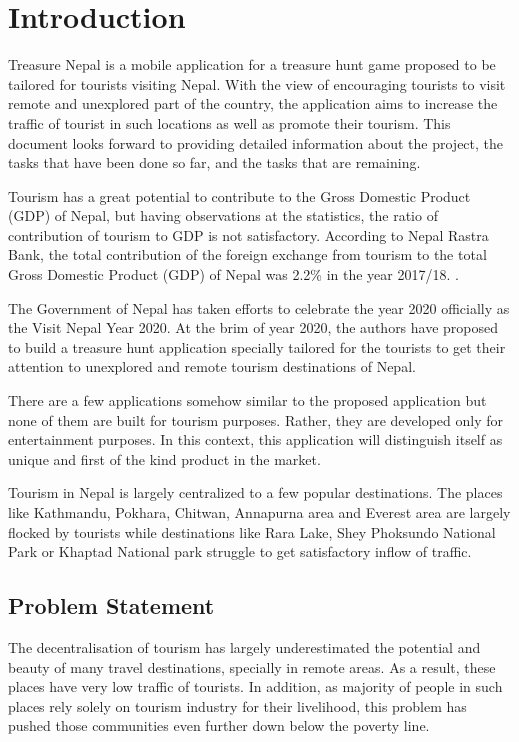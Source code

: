 \documentclass[12pt, a4paper, oneside]{article}
\begin{document}
\section{Introduction} 
Treasure Nepal is a mobile application for a treasure hunt game proposed to be tailored for tourists visiting Nepal. With the view of encouraging tourists to visit remote and unexplored part of the country, the application aims to increase the traffic of tourist in such locations as well as promote their tourism. This document looks forward to providing detailed information about the project, the tasks that have been done so far, and the tasks that are remaining.

Tourism has a great potential to contribute to the Gross Domestic Product (GDP) of Nepal, but having observations at the statistics, the ratio of contribution of tourism to GDP is not satisfactory. According to Nepal Rastra Bank, the total contribution of the foreign exchange from tourism to the total Gross Domestic Product (GDP) of Nepal was 2.2\% in the year 2017/18. \cite{tourismstats}.

The Government of Nepal has taken efforts to celebrate the year 2020 officially as the Visit Nepal Year 2020. At the brim of year 2020, the authors have proposed to build a treasure hunt application specially tailored for the tourists to get their attention to unexplored and remote tourism destinations of Nepal. 

There are a few applications somehow similar to the proposed application but none of them are built for tourism purposes. Rather, they are developed only for entertainment purposes. In this context, this application will distinguish itself as unique and first of the kind product in the market.

Tourism in Nepal is largely centralized to a few popular destinations. The places like Kathmandu, Pokhara, Chitwan, Annapurna area and Everest area are largely flocked by tourists while destinations like Rara Lake, Shey Phoksundo National Park or Khaptad National park struggle to get satisfactory inflow of traffic.

\subsection{Problem Statement}
The decentralisation of tourism has largely underestimated the potential and beauty of many travel destinations, specially in remote areas. As a result, these places have very low traffic of tourists. In addition, as majority of people in such places rely solely on tourism industry for their livelihood, this problem has pushed those communities even further down below the poverty line.
\end{document}
